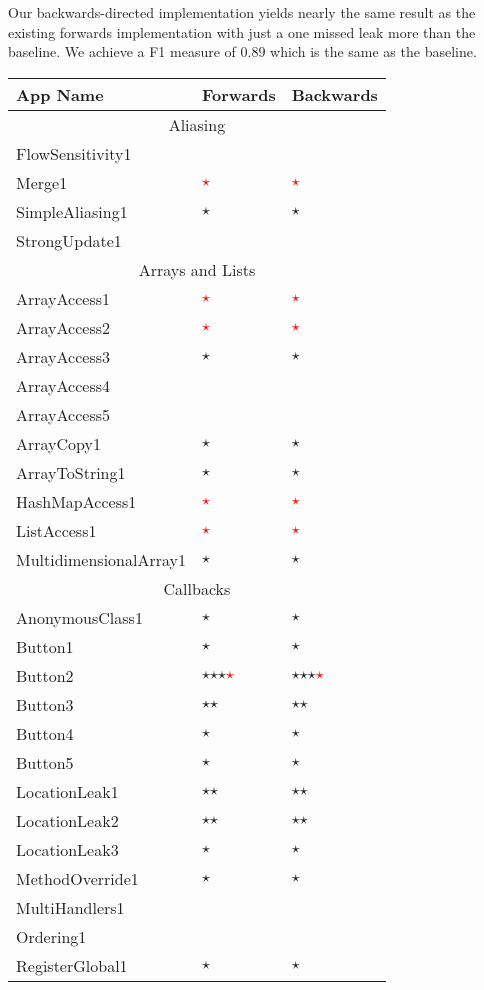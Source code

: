 \documentclass[../draft.tex]{subfiles}
\newcommand{\fp}{\textcolor{white}{\textcircled{\textcolor{red}{$\star$}}}}
\newcommand{\tp}[0]{\textcircled{$\star$}}
\newcommand{\tsub}[1]{\multicolumn{3}{c}{#1}\\\hline}
\begin{document}
    Our backwards-directed implementation yields nearly the same result as the existing forwards implementation with just a one missed leak more than the baseline.  We achieve a F1 measure of $0.89$ which is the same as the baseline.

    \begin{longtable}{l | l | l}%
        \textbf{App Name} & \textbf{Forwards} & \textbf{Backwards}\\
        \hline\hline
        \endhead
        \tsub{Aliasing}
        FlowSensitivity1 & &\\
        Merge1 & \fp & \fp\\
        SimpleAliasing1 & \tp & \tp\\
        StrongUpdate1 & &\\
        \hline
        \tsub{Arrays and Lists}
        ArrayAccess1 & \fp & \fp\\
        ArrayAccess2 & \fp & \fp\\
        ArrayAccess3 & \tp & \tp\\
        ArrayAccess4 &  & \\
        ArrayAccess5 &  & \\
        ArrayCopy1 & \tp & \tp\\
        ArrayToString1 & \tp & \tp\\
        HashMapAccess1 & \fp & \fp\\
        ListAccess1 & \fp & \fp\\
        MultidimensionalArray1 & \tp & \tp\\
        \hline
        \tsub{Callbacks}
        AnonymousClass1 & \tp & \tp\\
        Button1 & \tp & \tp \\
        Button2 & \tp \tp \tp \fp & \tp \tp \tp \fp\\
        Button3 & \tp \tp & \tp \tp\\
        Button4 & \tp & \tp\\
        Button5 & \tp & \tp\\
        LocationLeak1 & \tp \tp & \tp \tp\\
        LocationLeak2 & \tp \tp & \tp \tp\\
        LocationLeak3 & \tp & \tp\\
        MethodOverride1 & \tp & \tp\\
        MultiHandlers1 & & \\
        Ordering1 & & \\
        RegisterGlobal1 & \tp & \tp\\

\end{longtable}
\end{document}
